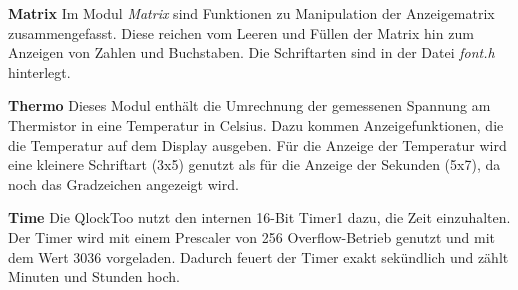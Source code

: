 \begin{multicols}{2}
\textbf{Matrix}
Im Modul \emph{Matrix} sind Funktionen zu Manipulation der Anzeigematrix zusammengefasst. Diese reichen vom Leeren und Füllen der Matrix hin zum Anzeigen von Zahlen und Buchstaben. Die Schriftarten sind in der Datei \emph{font.h} hinterlegt.

\textbf{Thermo}
Dieses Modul enthält die Umrechnung der gemessenen Spannung am Thermistor in eine Temperatur in Celsius.
Dazu kommen Anzeigefunktionen, die die Temperatur auf dem Display ausgeben.
Für die Anzeige der Temperatur wird eine kleinere Schriftart (3x5) genutzt als für die Anzeige der Sekunden (5x7), da noch das Gradzeichen angezeigt wird.

\textbf{Time}
Die QlockToo nutzt den internen 16-Bit Timer1 dazu, die Zeit einzuhalten.
Der Timer wird mit einem Prescaler von 256 Overflow-Betrieb genutzt und mit dem Wert 3036 vorgeladen.
Dadurch feuert der Timer exakt sekündlich und zählt Minuten und Stunden hoch.

\end{multicols}
